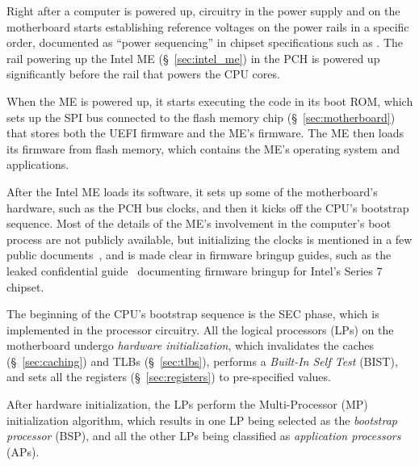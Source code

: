 
Right after a computer is powered up, circuitry in the power supply and on the
motherboard starts establishing reference voltages on the power rails in a
specific order, documented as ``power sequencing'' \cite{intel2010bringup} in
chipset specifications such as \cite{intel2015x99chipset}. The rail powering up
the Intel ME (\S~\ref{sec:intel_me}) in the PCH is powered up significantly
before the rail that powers the CPU cores.

When the ME is powered up,  it starts executing the code in its boot ROM, which
sets up the SPI bus connected to the flash memory chip
(\S~\ref{sec:motherboard}) that stores both the UEFI firmware and the ME's
firmware. The ME then loads its firmware from flash memory, which contains the
ME's operating system and applications.


After the Intel ME loads its software, it sets up some of the motherboard's
hardware, such as the PCH bus clocks, and then it kicks off the CPU's bootstrap
sequence. Most of the details of the ME's involvement in the computer's boot
process are not publicly available, but initializing the clocks is mentioned in
a few public documents~\cite{intel2015cpuio, purism2014meclock,
dice2011meclock, fitpc2014mehw}, and is made clear in firmware bringup guides,
such as the leaked confidential guide~\cite{intel2012mebringup} documenting
firmware bringup for Intel's Series 7 chipset.


The beginning of the CPU's bootstrap sequence is the SEC phase, which is
implemented in the processor circuitry. All the logical processors (LPs) on the
motherboard undergo \textit{hardware initialization}, which invalidates the
caches (\S~\ref{sec:caching}) and TLBs (\S~\ref{sec:tlbs}), performs a
\textit{Built-In Self Test} (BIST), and sets all the registers
(\S~\ref{sec:registers}) to pre-specified values.


After hardware initialization, the LPs perform the Multi-Processor (MP)
initialization algorithm, which results in one LP being selected as the
\textit{bootstrap processor} (BSP), and all the other LPs being classified as
\textit{application processors} (APs).

